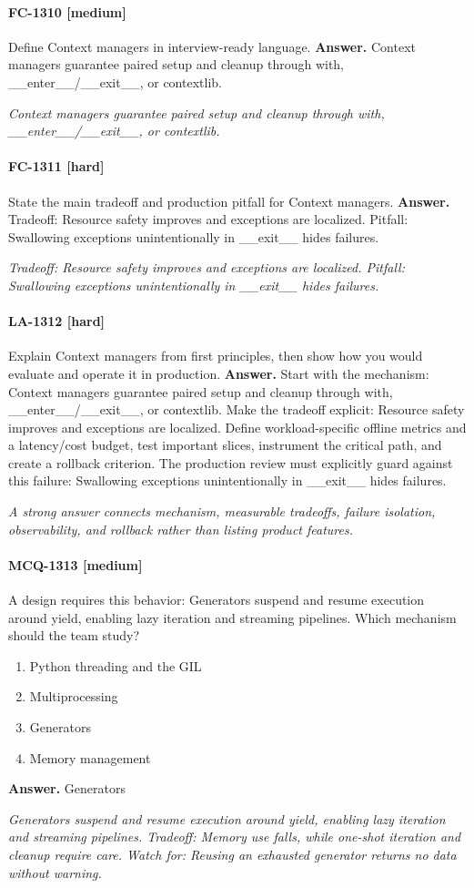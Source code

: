 \paragraph{FC-1310 [medium]} Define Context managers in interview-ready language.
\noindent\textbf{Answer.} Context managers guarantee paired setup and cleanup through with, \_\_enter\_\_/\_\_exit\_\_, or contextlib.
\par\textit{Context managers guarantee paired setup and cleanup through with, \_\_enter\_\_/\_\_exit\_\_, or contextlib.}
\paragraph{FC-1311 [hard]} State the main tradeoff and production pitfall for Context managers.
\noindent\textbf{Answer.} Tradeoff: Resource safety improves and exceptions are localized. Pitfall: Swallowing exceptions unintentionally in \_\_exit\_\_ hides failures.
\par\textit{Tradeoff: Resource safety improves and exceptions are localized. Pitfall: Swallowing exceptions unintentionally in \_\_exit\_\_ hides failures.}
\paragraph{LA-1312 [hard]} Explain Context managers from first principles, then show how you would evaluate and operate it in production.
\noindent\textbf{Answer.} Start with the mechanism: Context managers guarantee paired setup and cleanup through with, \_\_enter\_\_/\_\_exit\_\_, or contextlib. Make the tradeoff explicit: Resource safety improves and exceptions are localized. Define workload-specific offline metrics and a latency/cost budget, test important slices, instrument the critical path, and create a rollback criterion. The production review must explicitly guard against this failure: Swallowing exceptions unintentionally in \_\_exit\_\_ hides failures.
\par\textit{A strong answer connects mechanism, measurable tradeoffs, failure isolation, observability, and rollback rather than listing product features.}
\paragraph{MCQ-1313 [medium]} A design requires this behavior: Generators suspend and resume execution around yield, enabling lazy iteration and streaming pipelines. Which mechanism should the team study?
\begin{enumerate}[label=\Alph*.]
\item Python threading and the GIL
\item Multiprocessing
\item Generators
\item Memory management
\end{enumerate}
\noindent\textbf{Answer.} Generators
\par\textit{Generators suspend and resume execution around yield, enabling lazy iteration and streaming pipelines. Tradeoff: Memory use falls, while one-shot iteration and cleanup require care. Watch for: Reusing an exhausted generator returns no data without warning.}
